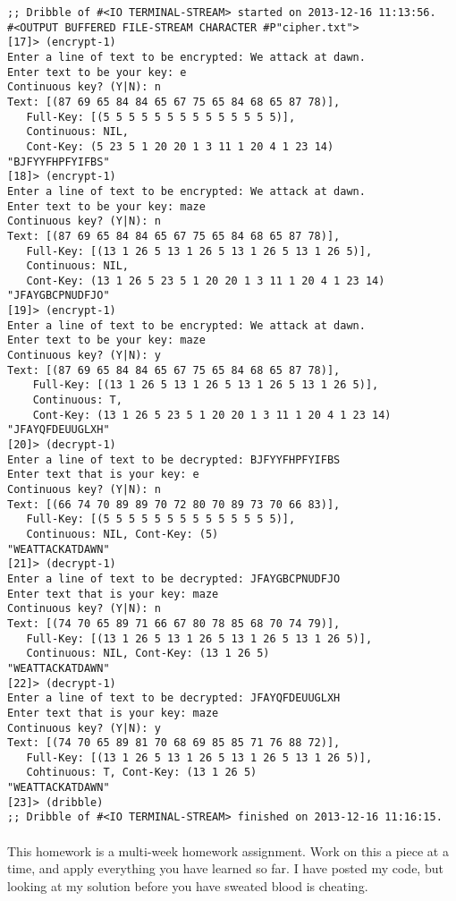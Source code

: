 \documentclass{article}
\begin{document}
\begin{verbatim}
;; Dribble of #<IO TERMINAL-STREAM> started on 2013-12-16 11:13:56.
#<OUTPUT BUFFERED FILE-STREAM CHARACTER #P"cipher.txt">
[17]> (encrypt-1)
Enter a line of text to be encrypted: We attack at dawn.
Enter text to be your key: e
Continuous key? (Y|N): n
Text: [(87 69 65 84 84 65 67 75 65 84 68 65 87 78)], 
   Full-Key: [(5 5 5 5 5 5 5 5 5 5 5 5 5 5)], 
   Continuous: NIL, 
   Cont-Key: (5 23 5 1 20 20 1 3 11 1 20 4 1 23 14)
"BJFYYFHPFYIFBS"
[18]> (encrypt-1)
Enter a line of text to be encrypted: We attack at dawn.
Enter text to be your key: maze
Continuous key? (Y|N): n
Text: [(87 69 65 84 84 65 67 75 65 84 68 65 87 78)], 
   Full-Key: [(13 1 26 5 13 1 26 5 13 1 26 5 13 1 26 5)], 
   Continuous: NIL, 
   Cont-Key: (13 1 26 5 23 5 1 20 20 1 3 11 1 20 4 1 23 14)
"JFAYGBCPNUDFJO"
[19]> (encrypt-1)
Enter a line of text to be encrypted: We attack at dawn.
Enter text to be your key: maze
Continuous key? (Y|N): y
Text: [(87 69 65 84 84 65 67 75 65 84 68 65 87 78)], 
    Full-Key: [(13 1 26 5 13 1 26 5 13 1 26 5 13 1 26 5)], 
    Continuous: T, 
    Cont-Key: (13 1 26 5 23 5 1 20 20 1 3 11 1 20 4 1 23 14)
"JFAYQFDEUUGLXH"
[20]> (decrypt-1)
Enter a line of text to be decrypted: BJFYYFHPFYIFBS
Enter text that is your key: e
Continuous key? (Y|N): n
Text: [(66 74 70 89 89 70 72 80 70 89 73 70 66 83)], 
   Full-Key: [(5 5 5 5 5 5 5 5 5 5 5 5 5 5)], 
   Continuous: NIL, Cont-Key: (5)
"WEATTACKATDAWN"
[21]> (decrypt-1)
Enter a line of text to be decrypted: JFAYGBCPNUDFJO
Enter text that is your key: maze
Continuous key? (Y|N): n
Text: [(74 70 65 89 71 66 67 80 78 85 68 70 74 79)], 
   Full-Key: [(13 1 26 5 13 1 26 5 13 1 26 5 13 1 26 5)], 
   Continuous: NIL, Cont-Key: (13 1 26 5)
"WEATTACKATDAWN"
[22]> (decrypt-1)
Enter a line of text to be decrypted: JFAYQFDEUUGLXH
Enter text that is your key: maze
Continuous key? (Y|N): y
Text: [(74 70 65 89 81 70 68 69 85 85 71 76 88 72)], 
   Full-Key: [(13 1 26 5 13 1 26 5 13 1 26 5 13 1 26 5)], 
   Cohtinuous: T, Cont-Key: (13 1 26 5)
"WEATTACKATDAWN"
[23]> (dribble)
;; Dribble of #<IO TERMINAL-STREAM> finished on 2013-12-16 11:16:15.
\end{verbatim}

\paragraph{}This homework is a multi-week homework assignment. Work on this a piece at a time, and apply everything you have learned so far. I have posted my code, but looking at my solution before you have sweated blood is cheating.
\end{document}
